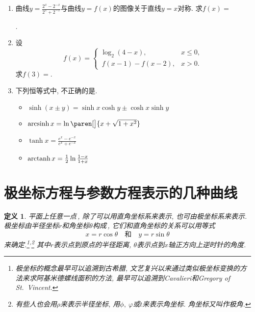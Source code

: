 \documentclass[a4paper,punct=CCT]{ctexbook}
\theoremstyle{break}
\newtheorem*{definition*}{定义}
\newif\ifshowsol
\let\leq\leqslant
\let\le\leq
\begin{document}
\begin{enumerate}
\item 曲线\(y = \frac{2^x-2^{-x}}{2^x+2^{-x}}\)与曲线\(y = f(x)\)的图像关于直线\(y = x\)对称.  求\(f(x) =\)
  \ifshowsol
  {\setlength{\ULdepth}{1.5ex}\uline{\makebox[6em]{\(\frac12 \log_2\frac{1+x}{1-x}\)}}}.
  \else
  \uline{\makebox[6em]{}}.
  \fi

\item 设
  \[
    f(x) =
    \begin{cases}
      \log_2 (4-x), & x \le 0, \\
      \,f(x-1) - f(x-2), & x > 0.
    \end{cases}
  \]
  求\(f(3) =\)\uline{\makebox[3em]{\ifshowsol\(-2\)\fi}}.

\item 下列恒等式中, 不正确的是\uline{\makebox[6em]{}}.
  \begin{itemize}
    \renewcommand{\labelitemi}{\faCircleThin}
  \item \(\sinh(x \pm y) = \sinh x \cosh y \pm \cosh x \sinh y\)
  \item \(\arcsinh x = \ln\paren[\big]{x + \sqrt{1+x^2}}\)
  \item \(\tanh x = \frac{e^x-e^{-x}}{e^x+e^{-x}}\)
    \ifshowsol
  \item[\faCircle]
    \else
  \item
    \fi
    \(\operatorname{arctanh} x = \frac12 \ln\frac{1-x}{1+x}\)
  \end{itemize}
\end{enumerate}

\fi

\section{极坐标方程与参数方程表示的几种曲线}

\begin{definition*}
  平面上任意一点\,, 除了可以用直角坐标系来表示, 也可由极坐标系来表示.  极坐标由半径坐标\(r\)和角坐标\(\theta\)构成\,, 它们和直角坐标的关系可以用等式
  \[
    x = r \cos\theta \quad \text{和} \quad y = r \sin \theta
  \]
  来确定.\footnote{极坐标的概念最早可以追溯到古希腊, 文艺复兴以来通过类似极坐标变换的方法来求阿基米德螺线面积的方法, 最早可以追溯到Cavalieri和Gregory of St.~Vincent.}\textsuperscript{,}\footnote{有些人也会用\(\rho\)来表示半径坐标, 用\(\phi,\ \varphi\)或\(t\)来表示角坐标.  角坐标又叫作极角.}
  其中\(r\)表示点到原点的半径距离, \(\theta\)表示点到\(x\)轴正方向上逆时针的角度.
\end{definition*}
\end{document}
